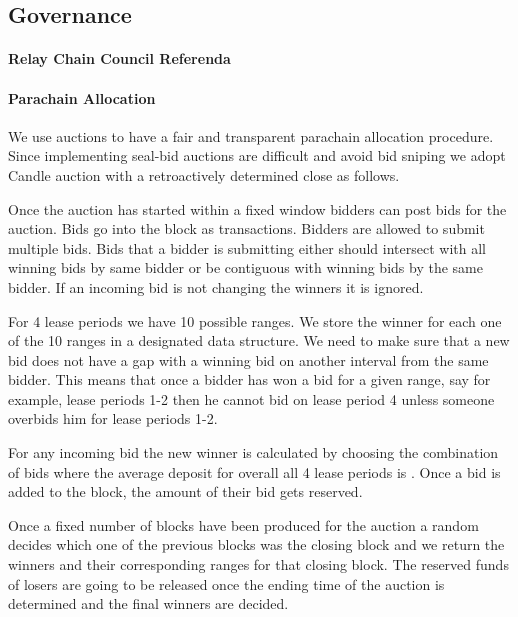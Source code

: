 \subsection{Governance}\label{sec:governance}
 \paragraph{Relay Chain Council Referenda\eray{}{:}}
 
 
 \paragraph{Parachain Allocation\eray{}{:}}
We use auctions to have a fair and transparent parachain allocation procedure.
Since implementing seal-bid auctions are difficult and  avoid bid sniping\eray{}{,} we adopt  Candle auction \cite{Fuellbrunn:2012:CandleAuction} with a retroactively determined close as follows.

Once the auction has started within a fixed window\eray{}{,} bidders can post bids for the auction.
Bids go into the block as transactions.
Bidders are allowed to submit multiple bids.
Bids that a bidder is submitting either should intersect with all winning bids by same bidder or be contiguous with winning bids by the same bidder.
If an incoming bid is not changing the winners\eray{}{,} it is ignored.

For 4 lease periods\eray{}{,} we have 10 possible ranges.
We store the winner for each one of the 10 ranges in a designated data structure.
We need to make sure that a new bid does not have a gap with a winning bid on another interval from the same bidder.
This means that once a bidder has won a bid for a given range, say for example, lease periods 1-2\eray{}{,}  then he cannot bid on lease period 4 unless someone overbids him for lease periods 1-2.

For any incoming bid\eray{}{,} the new winner is calculated by choosing the combination of bids\eray{}{,} where the average deposit for overall all 4 lease periods is .
Once a bid is added to the block, the amount of their bid gets reserved.

Once a fixed number of blocks have been produced for the auction\eray{}{,} a random  decides which one of the previous blocks was the closing block\eray{}{,} and we return the winners and their corresponding ranges for that closing block.
The reserved funds of losers are going to be released once the ending time of the auction is determined\eray{}{,} and the final winners are decided.

